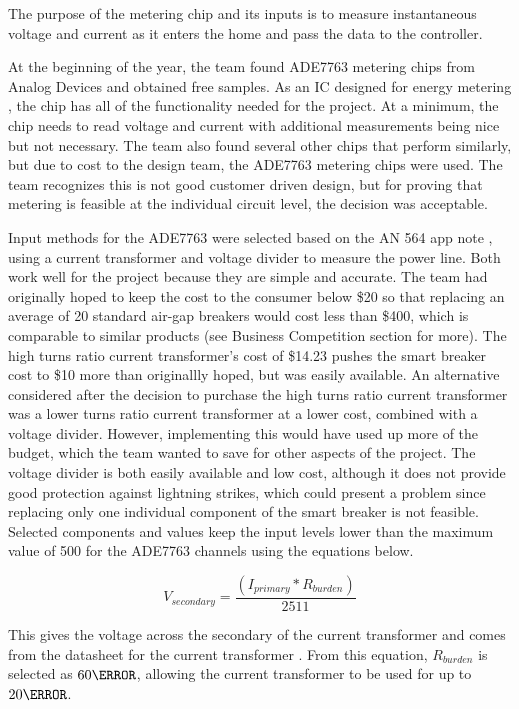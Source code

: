 The purpose of the metering chip and its inputs is to measure instantaneous voltage and current as it enters the home and pass the data to the controller. 

At the beginning of the year, the team found ADE7763 metering chips from Analog Devices and obtained free samples. As an IC designed for energy metering \cite{ADE7763}, the chip has all of the functionality needed for the project. At a minimum, the chip needs to read voltage and current with additional measurements being nice but not necessary. The team also found several other chips that perform similarly, but due to cost to the design team, the ADE7763 metering chips were used. The team recognizes this is not good customer driven design, but for proving that metering is feasible at the individual circuit level, the decision was acceptable.

Input methods for the ADE7763 were selected based on the AN 564 app note \cite{AN564}, using a current transformer and voltage divider to measure the power line. Both work well for the project because they are simple and accurate. The team had originally hoped to keep the cost to the consumer below \$20 so that replacing an average of 20 standard air-gap breakers would cost less than \$400, which is comparable to similar products (see Business Competition section for more). The high turns ratio current transformer's cost of \$14.23 pushes the smart breaker cost to \$10 more than originallly hoped, but was easily available. An alternative considered after the decision to purchase the high turns ratio current transformer was a lower turns ratio current transformer at a lower cost, combined with a voltage divider. However, implementing this would have used up more of the budget, which the team wanted to save for other aspects of the project. The voltage divider is both easily available and low cost, although it does not provide good protection against lightning strikes, which could present a problem since replacing only one individual component of the smart breaker is not feasible. Selected components and values keep the input levels lower than the maximum value of 500 \milli\volt \cite{ADE7763} for the ADE7763 channels using the equations below.

\begin{equation} %
V_{secondary}=\frac{(I_{primary}*R_{burden})}{2511}
\label{eq:v_secondary}
\end{equation}

This gives the voltage across the secondary of the current transformer and comes from the datasheet for the current transformer \cite{CT_nate}. From this equation, $R_{burden}$ is selected as $60 \ohm$, allowing the current transformer to be used for up to $20\ampere$.


